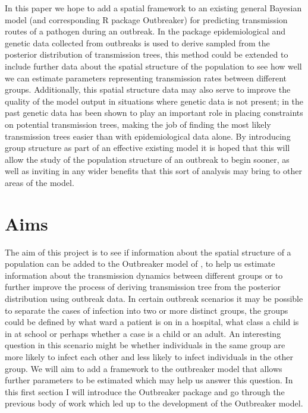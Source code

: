 \documentclass[11pt,a4paper]{report}
\begin{document}
In this paper we hope to add a spatial framework to an existing general Bayesian model (and corresponding R package Outbreaker) for predicting transmission routes of a pathogen during an outbreak. In the package epidemiological and genetic data collected from outbreaks is used to derive sampled from the posterior distribution of transmission trees, this method could be extended to include further data about the spatial structure of the population to see how well we can estimate parameters representing transmission rates between different groups. Additionally, this spatial structure data may also serve to improve the quality of the model output in situations where genetic data is not present; in the past genetic data has been shown to play an important role in placing constraints on potential transmission trees, making the job of finding the most likely transmission trees easier than with epidemiological data alone. By introducing group structure as part of an effective existing model it is hoped that this will allow the study of the population structure of an outbreak to begin sooner, as well as inviting in any wider benefits that this sort of analysis may bring to other areas of the model.
\section{Aims}
The aim of this project is to see if information about the spatial structure of a population can be added to the Outbreaker model of \citet{outbrkr}, to help us estimate information about the transmission dynamics between different groups or to further improve the process of deriving transmission tree from the posterior distribution using outbreak data. In certain outbreak scenarios it may be possible to separate the cases of infection into two or more distinct groups, the groups could be defined by what ward a patient is on in a hospital, what class a child is in at school or perhaps whether a case is a child or an adult. An interesting question in this scenario might be whether individuals in the same group are more likely to infect each other and less likely to infect individuals in the other group. We will aim to add a framework to the outbreaker model that allows further parameters to be estimated which may help us answer this question. In this first section I will introduce the Outbreaker package and go through the previous body of work which led up to the development of the Outbreaker model.
\end{document}
